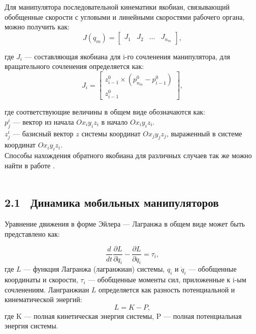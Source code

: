\documentclass[14pt, a4paper]{extreport}
\begin{document}
Для манипулятора последовательной кинематики якобиан, связывающий обобщенные скорости с угловыми и линейными скоростями рабочего органа, можно получить как:
\begin{equation}
J(q_m) = 
\begin{bmatrix}
J_1 & J_2 & ... & J_{n_m}
\end{bmatrix},
\tag{46} \label{eq:46}
\end{equation}

\noindent
где $J_i$ --- составляющая якобиана для i-го сочленения манипулятора, для вращательного сочленения определяется как:
\begin{equation}
J_i = 
\begin{bmatrix}
z^0_{i-1} \times (p^0_{n_m} - p^0_{i-1})\\[1mm]
z^0_{i-1}
\end{bmatrix},
\tag{47} \label{eq:47}
\end{equation}

\noindent
где соответствующие величины в общем виде обозначаются как:\\[2mm]
$p^i_j$ --- вектор из начала $Ox_iy_i z_i$ в начало $Ox_i y_i z_i$.\\[2mm]
$z_j^i$ --- базисный вектор $z$ системы координат $Ox_jy_j z_j$, выраженный в системе координат $Ox_iy_iz_i$.\\[2mm]
\indent Способы нахождения обратного якобиана для различных случаев так же можно найти в работе \cite{Buss}.
\ \\
\ \\

\subsection*{2.1 \ Динамика мобильных манипуляторов}

Уравнение движения в форме Эйлера --- Лагранжа в общем виде может быть представлено как:

\[
\dfrac{d}{dt} \frac{\partial L}{\partial \dot{q}_i} - \frac{\partial L}{\partial q_i} = \tau_i,
\tag{48} \label{eq:48}
\]
\noindent
где $L$ --- функция Лагранжа (лагранжиан) системы, $q_i$ и $\dot{q}_i$ --- обобщенные координаты и скорости, $\tau_i$ --- обобщенные моменты сил, приложенные к i-ым сочленениям.
Лангранжиан $L$ определяется как разность потенциальной и кинематической энергий:
\[
L = K − P,
\tag{49} \label{eq:49}
\]
\noindent
где K --- полная кинетическая энергия системы, P --- полная потенциальная энергия системы.
\end{document}
